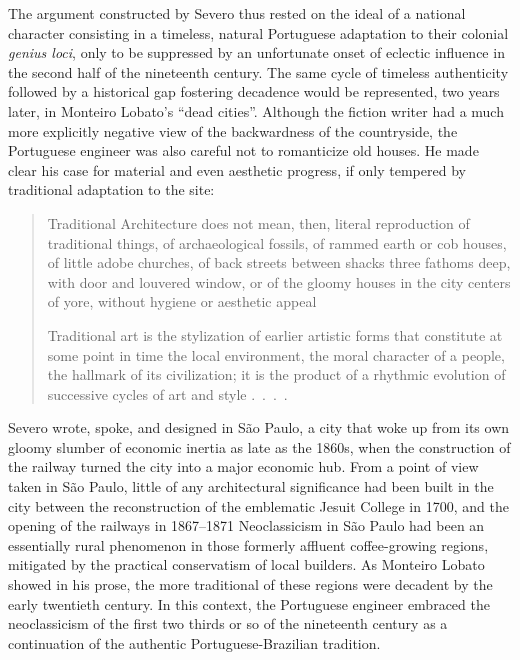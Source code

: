 The argument constructed by Severo thus rested on the ideal of a
national character consisting in a timeless, natural Portuguese
adaptation to their colonial \emph{genius loci}, only to be suppressed
by an unfortunate onset of eclectic influence in the second half of the
nineteenth century. The same cycle of timeless authenticity followed by
a historical gap fostering decadence would be represented, two years
later, in Monteiro Lobato's ``dead cities''. Although the fiction writer
had a much more explicitly negative view of the backwardness of the
countryside, the Portuguese engineer was also careful not to romanticize
old houses. He made clear his case for material and even aesthetic
progress, if only tempered by traditional adaptation to the site:

\begin{quote}
Traditional Architecture does not mean, then, literal reproduction of
traditional things, of archaeological fossils, of rammed earth or cob
houses, of little adobe churches, of back streets between shacks three
fathoms deep, with door and louvered window, or of the gloomy houses in
the city centers of yore, without hygiene or aesthetic appeal

Traditional art is the stylization of earlier artistic forms that
constitute at some point in time the local environment, the moral
character of a people, the hallmark of its civilization; it is the
product of a rhythmic evolution of successive cycles of art and style
.~.~.~. \autocite[p.~423--424]{severo:1917arte}
\end{quote}

Severo wrote, spoke, and designed in São Paulo, a city that woke up from
its own gloomy slumber of economic inertia as late as the 1860s, when
the construction of the railway turned the city into a major economic
hub. From a point of view taken in São Paulo, little of any
architectural significance had been built in the city between the
reconstruction of the emblematic Jesuit College in 1700, and the opening
of the railways in 1867--1871 \autocite[p.~72]{lemos:1987ecletismo}
Neoclassicism in São Paulo had been an essentially rural phenomenon in
those formerly affluent coffee-growing regions, mitigated by the
practical conservatism of local builders. As Monteiro Lobato showed in
his prose, the more traditional of these regions were decadent by the
early twentieth century. In this context, the Portuguese engineer
embraced the neoclassicism of the first two thirds or so of the
nineteenth century as a continuation of the authentic
Portuguese-Brazilian tradition.


